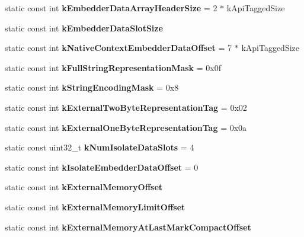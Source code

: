 \begin{DoxyCompactItemize}
static const int {\bfseries k\+Embedder\+Data\+Array\+Header\+Size} = 2 $\ast$ k\+Api\+Tagged\+Size
\item 
static const int {\bfseries k\+Embedder\+Data\+Slot\+Size}
\item 
\mbox{\label{classv8_1_1internal_1_1Internals_a691a2ab474f9e770dfea35a8c1a71abd}} 
static const int {\bfseries k\+Native\+Context\+Embedder\+Data\+Offset} = 7 $\ast$ k\+Api\+Tagged\+Size
\item 
\mbox{\label{classv8_1_1internal_1_1Internals_a5c39a86b30463928ea719def66916507}} 
static const int {\bfseries k\+Full\+String\+Representation\+Mask} = 0x0f
\item 
\mbox{\label{classv8_1_1internal_1_1Internals_a1927ac3def13a57e03025e62ca46d1c5}} 
static const int {\bfseries k\+String\+Encoding\+Mask} = 0x8
\item 
\mbox{\label{classv8_1_1internal_1_1Internals_a73faf917416d2519b65c7255e77a74ce}} 
static const int {\bfseries k\+External\+Two\+Byte\+Representation\+Tag} = 0x02
\item 
\mbox{\label{classv8_1_1internal_1_1Internals_ac789a0a139ccbacec0c5fb2d79427305}} 
static const int {\bfseries k\+External\+One\+Byte\+Representation\+Tag} = 0x0a
\item 
\mbox{\label{classv8_1_1internal_1_1Internals_a258de87ae638f06a1deebccf4fd93c3f}} 
static const uint32\+\_\+t {\bfseries k\+Num\+Isolate\+Data\+Slots} = 4
\item 
\mbox{\label{classv8_1_1internal_1_1Internals_ad722bf4760df09958cd1062db4a5524c}} 
static const int {\bfseries k\+Isolate\+Embedder\+Data\+Offset} = 0
\item 
static const int {\bfseries k\+External\+Memory\+Offset}
\item 
static const int {\bfseries k\+External\+Memory\+Limit\+Offset}
\item 
static const int {\bfseries k\+External\+Memory\+At\+Last\+Mark\+Compact\+Offset}
\item 

\end{DoxyCompactItemize}
